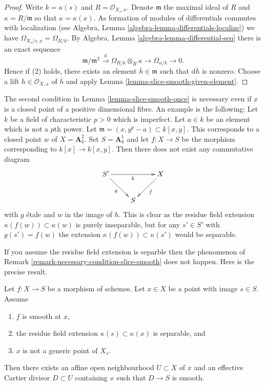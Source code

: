 \begin{proof}
Write $k = \kappa(s)$ and $R = \mathcal{O}_{X_s, x}$.
Denote $\mathfrak m$ the maximal ideal of $R$ and
$\kappa = R/\mathfrak m$ so that $\kappa = \kappa(x)$.
As formation of modules of differentials commutes with localization (see
Algebra, Lemma \ref{algebra-lemma-differentials-localize})
we have $\Omega_{X_s/s, x} = \Omega_{R/k}$. By
Algebra, Lemma \ref{algebra-lemma-differential-seq}
there is an exact sequence
$$
\mathfrak m/\mathfrak m^2 \xrightarrow{\text{d}}
\Omega_{R/k} \otimes_R \kappa \to
\Omega_{\kappa/k} \to 0.
$$
Hence if (2) holds, there exists an element $\overline{h} \in \mathfrak m$
such that $\text{d}\overline{h}$ is nonzero. Choose a lift
$h \in \mathcal{O}_{X, x}$ of $\overline{h}$ and apply
Lemma \ref{lemma-slice-smooth-given-element}.
\end{proof}

\begin{remark}
\label{remark-necessary-condition-slice-smooth}
The second condition in
Lemma \ref{lemma-slice-smooth-once}
is necessary even if $x$ is a closed point of a positive
dimensional fibre. An example is the following: Let $k$ be a field
of characteristic $p > 0$ which is imperfect. Let $a \in k$ be an
element which is not a $p$th power. Let
$\mathfrak m = (x, y^p - a) \subset k[x, y]$. This corresponds to a closed
point $w$ of $X = \mathbf{A}^2_k$. Set $S = \mathbf{A}^1_k$ and
let $f : X \to S$ be the morphism corresponding to $k[x] \to k[x, y]$.
Then there does not exist any commutative diagram
$$
\xymatrix{
S' \ar[rr]_h \ar[rd]_g & & X \ar[ld]^f \\
& S
}
$$
with $g$ \'etale and $w$ in the image of $h$. This is clear as the residue
field extension $\kappa(f(w)) \subset \kappa(w)$ is purely inseparable,
but for any $s' \in S'$ with $g(s') = f(w)$ the extension
$\kappa(f(w)) \subset \kappa(s')$ would be separable.
\end{remark}

\noindent
If you assume the residue field extension is separble then the
phenomenon of
Remark \ref{remark-necessary-condition-slice-smooth}
does not happen. Here is the precise result.

\begin{lemma}
\label{lemma-slice-smooth-once-separable-residue-field-extension}
Let $f : X \to S$ be a morphism of schemes.
Let $x \in X$ be a point with image $s \in S$.
Assume
\begin{enumerate}
\item $f$ is smooth at $x$,
\item the residue field extension $\kappa(s) \subset \kappa(x)$
is separable, and
\item $x$ is not a generic point of $X_s$.
\end{enumerate}
Then there exists an affine open neighbourhood $U \subset X$ of $x$
and an effective Cartier divisor $D \subset U$ containing $x$ such that
$D \to S$ is smooth.
\end{lemma}

